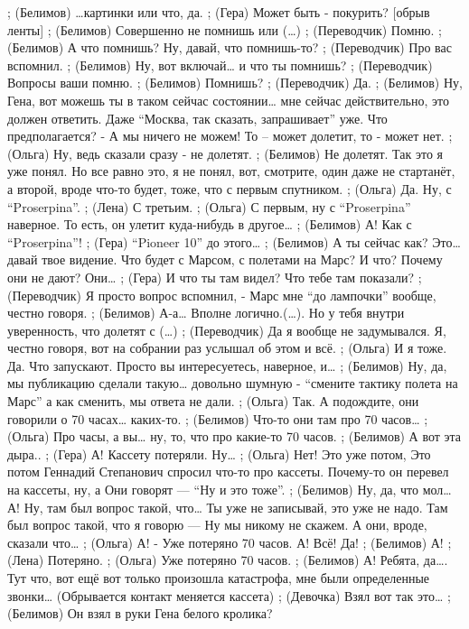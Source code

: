 ;	(Белимов) …картинки или что, да.
;	(Гера) Может быть - покурить? 
[обрыв ленты]
;	(Белимов) Совершенно не помнишь или (…)
;	(Переводчик) Помню.
;	(Белимов) А что помнишь? Ну, давай, что помнишь-то?
;	(Переводчик) Про вас вспомнил.
;	(Белимов) Ну, вот включай… и что ты помнишь?
;	(Переводчик) Вопросы ваши помню.
;	(Белимов) Помнишь?
;	(Переводчик) Да.
;	(Белимов) Ну, Гена, вот можешь ты в таком сейчас состоянии… мне сейчас действительно, это должен ответить. Даже ``Москва, так сказать, запрашивает'' уже. Что предполагается? - А мы ничего не можем! То – может долетит, то - может нет.
;	(Ольга) Ну, ведь сказали сразу - не долетят.
;	(Белимов) Не долетят. Так это я уже понял. Но все равно это, я не понял, вот, смотрите, один даже не стартанёт, а второй, вроде что-то будет, тоже, что с первым спутником.
;	(Ольга) Да. Ну, с ``Proserpina''.
;	(Лена) С третьим.
;	(Ольга) С первым, ну с ``Proserpina'' наверное. То есть, он улетит куда-нибудь в другое…
;	(Белимов) А! Как с ``Proserpina''!
;	(Гера) ``Pioneer 10'' до этого…
;	(Белимов) А ты сейчас как? Это… давай твое видение. Что будет с Марсом, с полетами на Марс? И что? Почему они не дают? Они…
;	(Гера) И что ты там видел? Что тебе там показали?
;	(Переводчик) Я просто вопрос вспомнил, - Марс мне ``до лампочки'' вообще, честно говоря.
;	(Белимов) А-а… Вполне логично.(…). Но у тебя внутри уверенность, что долетят с (…)
;	(Переводчик) Да я вообще не задумывался. Я, честно говоря, вот на собрании раз услышал об этом и всё.
;	(Ольга) И я тоже. Да. Что запускают. Просто вы интересуетесь, наверное, и… 
;	(Белимов) Ну, да, мы публикацию сделали такую… довольно шумную - ``смените тактику полета на Марс'' а как сменить, мы ответа не дали.
;	(Ольга) Так. А подождите, они говорили о 70 часах… каких-то. 
;	(Белимов) Что-то они там про 70 часов…
;	(Ольга) Про часы, а вы…  ну, то, что про какие-то 70 часов.
;	(Белимов) А вот эта дыра..
;	(Гера) А! Кассету потеряли. Ну…
;	(Ольга) Нет! Это уже потом, Это потом Геннадий Степанович спросил что-то про кассеты. Почему-то он перевел на кассеты, ну, а Они говорят — ``Ну и это тоже''.
;	(Белимов) Ну, да, что мол…А! Ну, там был вопрос такой, что… Ты уже не записывай, это уже не надо. Там был вопрос такой, что я говорю — Ну мы никому не скажем.  А они, вроде, сказали что…
;	(Ольга) А! - Уже потеряно 70 часов. А! Всё! Да!
;	(Белимов) А!
;	(Лена) Потеряно.
;	(Ольга) Уже потеряно 70 часов.
;	(Белимов) А! Ребята, да…. Тут что, вот ещё вот только произошла катастрофа, мне были определенные звонки…
(Обрывается контакт меняется кассета)
;	(Девочка) Взял вот так это…
;	(Белимов) Он взял в руки Гена белого кролика?
